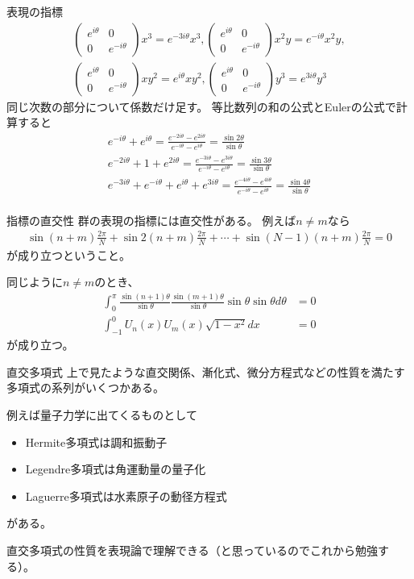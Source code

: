\documentclass[dvipdfmx]{beamer}
\begin{document}
\begin{frame}{表現の指標}
\begin{align*}
\begin{pmatrix}e^{i\theta}&0\\0&e^{-i\theta}\end{pmatrix}x^3=e^{-3i\theta}x^3,
\begin{pmatrix}e^{i\theta}&0\\0&e^{-i\theta}\end{pmatrix}x^2y=e^{-i\theta}x^2y,\\
\begin{pmatrix}e^{i\theta}&0\\0&e^{-i\theta}\end{pmatrix}xy^2=e^{i\theta}xy^2,
\begin{pmatrix}e^{i\theta}&0\\0&e^{-i\theta}\end{pmatrix}y^3=e^{3i\theta}y^3
\end{align*}
同じ次数の部分について係数だけ足す。
等比数列の和の公式とEulerの公式で計算すると
\begin{align*}
e^{-i\theta}+e^{i\theta}=\frac{e^{-2i\theta}-e^{2i\theta}}{e^{-i\theta}-e^{i\theta}}=\frac{\sin2\theta}{\sin\theta}\\
e^{-2i\theta}+1+e^{2i\theta}=\frac{e^{-3i\theta}-e^{3i\theta}}{e^{-i\theta}-e^{i\theta}}=\frac{\sin3\theta}{\sin\theta}\\
e^{-3i\theta}+e^{-i\theta}+e^{i\theta}+e^{3i\theta}=\frac{e^{-4i\theta}-e^{4i\theta}}{e^{-i\theta}-e^{i\theta}}=\frac{\sin4\theta}{\sin\theta}\\
\end{align*}
\end{frame}

\begin{frame}{指標の直交性}
群の表現の指標には直交性がある。
例えば$n\neq m$なら
\begin{align*}
\sin(n+m)\frac{2\pi}{N}+\sin2(n+m)\frac{2\pi}{N}+\cdots+\sin(N-1)(n+m)\frac{2\pi}{N}=0
\end{align*}
が成り立つということ。

同じように$n\neq m$のとき、
\begin{align*}
\int_0^\pi\frac{\sin (n+1)\theta}{\sin\theta}\frac{\sin (m+1)\theta}{\sin\theta}\sin\theta \sin\theta d\theta&=0\\
\int_{-1}^0U_n(x)U_m(x)\sqrt{1-x^2}dx&=0
\end{align*}
が成り立つ。
\end{frame}

\begin{frame}{直交多項式}
上で見たような直交関係、漸化式、微分方程式などの性質を満たす多項式の系列がいくつかある。

例えば量子力学に出てくるものとして
\begin{itemize}
\item Hermite多項式は調和振動子
\item Legendre多項式は角運動量の量子化
\item Laguerre多項式は水素原子の動径方程式
\end{itemize}
がある。

直交多項式の性質を表現論で理解できる（と思っているのでこれから勉強する）。
\end{frame}
\end{document}
